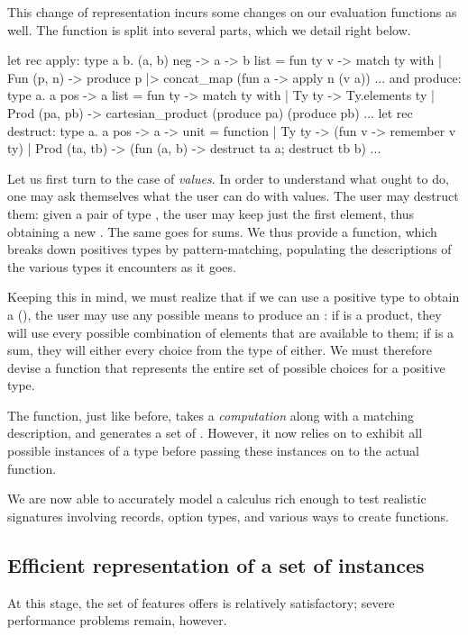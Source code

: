 This change of representation incurs some changes on our evaluation functions
as well. The  function is split into several parts, which we detail
right below.
%
\begin{ocamlcode}
let rec apply: type a b. (a, b) neg -> a -> b list =
  fun ty v -> match ty with
  | Fun (p, n) ->
      produce p |> concat_map (fun a -> apply n (v a))
  ...
and produce: type a. a pos -> a list =
  fun ty -> match ty with
  | Ty ty -> Ty.elements ty
  | Prod (pa, pb) ->
      cartesian_product (produce pa) (produce pb)
  ...
let rec destruct: type a. a pos -> a -> unit =
  function
  | Ty ty -> (fun v ->
      remember v ty)
  | Prod (ta, tb) -> (fun (a, b) ->
      destruct ta a;
      destruct tb b)
  ...
\end{ocamlcode}
%
Let us first turn to the case of \emph{values}. In order to understand what \arti
ought to do, one may ask themselves what the user can do with values. The user
may destruct them: given a pair of type , the user may keep just
the first element, thus obtaining a new . The same goes for sums. We
thus provide a  function, which breaks down positives types by
pattern-matching, populating the descriptions of the various types it encounters
as it goes.

Keeping this in mind, we must realize that if we can use a positive type
 to obtain a  (), the user may use any possible
means to produce an : if  is a product, they will use every
possible combination of elements that are available to them; if  is a
sum, they will either every choice from the type of either. We must therefore
devise a function  that represents the entire set of possible
choices for a positive type.

The  function, just like before, takes a \emph{computation} along
with a matching description, and generates a set of . However, it now
relies on  to exhibit all possible instances of a type before
passing these instances on to the actual function.

We are now able to accurately model a calculus rich enough to test realistic
signatures involving records, option types, and various ways to create
functions.

\subsection{Efficient representation of a set of instances}
\label{sec:efficient}

At this stage, the set of features \arti offers is relatively satisfactory;
severe performance problems remain, however.
